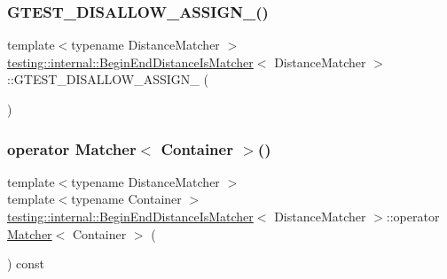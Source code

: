 \subsubsection{\texorpdfstring{G\+T\+E\+S\+T\+\_\+\+D\+I\+S\+A\+L\+L\+O\+W\+\_\+\+A\+S\+S\+I\+G\+N\+\_\+()}{GTEST\_DISALLOW\_ASSIGN\_()}}
{\footnotesize\ttfamily template$<$typename Distance\+Matcher $>$ \\
\hyperlink{classtesting_1_1internal_1_1BeginEndDistanceIsMatcher}{testing\+::internal\+::\+Begin\+End\+Distance\+Is\+Matcher}$<$ Distance\+Matcher $>$\+::G\+T\+E\+S\+T\+\_\+\+D\+I\+S\+A\+L\+L\+O\+W\+\_\+\+A\+S\+S\+I\+G\+N\+\_\+ (\begin{DoxyParamCaption}\item[{\hyperlink{classtesting_1_1internal_1_1BeginEndDistanceIsMatcher}{Begin\+End\+Distance\+Is\+Matcher}$<$ Distance\+Matcher $>$}]{ }\end{DoxyParamCaption})\hspace{0.3cm}{\ttfamily [private]}}

\mbox{\label{classtesting_1_1internal_1_1BeginEndDistanceIsMatcher_af4d79ed63bce73e5cecd6f542aeb57ce}} 
\subsubsection{\texorpdfstring{operator Matcher$<$ Container $>$()}{operator Matcher< Container >()}}
{\footnotesize\ttfamily template$<$typename Distance\+Matcher $>$ \\
template$<$typename Container $>$ \\
\hyperlink{classtesting_1_1internal_1_1BeginEndDistanceIsMatcher}{testing\+::internal\+::\+Begin\+End\+Distance\+Is\+Matcher}$<$ Distance\+Matcher $>$\+::operator \hyperlink{classtesting_1_1Matcher}{Matcher}$<$ Container $>$ (\begin{DoxyParamCaption}{ }\end{DoxyParamCaption}) const\hspace{0.3cm}{\ttfamily [inline]}}




